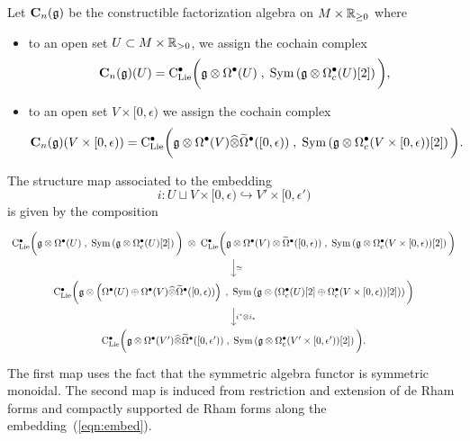 \documentclass[11pt]{amsart}
\numberwithin{equation}{section}
\def\brian{\textcolor{blue}{BW: }\textcolor{blue}}
\begin{document}
\begin{dfn}
\label{dfn:constructible1}
Let $\mathbf C_n(\mathfrak g)$ be the constructible factorization algebra on $M \times \mathbb R_{\geq 0}$ where
\begin{itemize}
\item to an open set $U \subset M \times \mathbb R_{> 0}$, we assign the cochain complex 
\[
\mathbf C_n (\mathfrak g) (U) = {\rm C}_{\rm Lie}^\bullet \bigg(\mathfrak g \otimes \Omega^\bullet (U) \; , \; {\rm Sym} \left(\mathfrak g \otimes \Omega^\bullet_c(U) [2] \right) \bigg), 
\]
\item to an open set $V \times [0,\epsilon)$ we assign the cochain complex 
\[
\mathbf C_n (\mathfrak g) (V \times [0,\epsilon)) = {\rm C}_{\rm Lie}^\bullet\bigg(\mathfrak g \otimes \Omega^\bullet(V) \widehat{\otimes} \widetilde{\Omega}^\bullet([0,\epsilon))  \; , \; {\rm Sym}\left(\mathfrak g \otimes \Omega^\bullet_c (V \times [0,\epsilon))[2] \right) \bigg).
\]
\end{itemize}
The structure map associated to the embedding 
\begin{equation}\label{eqn:embed}
i : U \sqcup V \times [0, \epsilon) \hookrightarrow V' \times [0,\epsilon')
\end{equation}
is given by the composition
\[
\begin{tikzcd}
\clies \bigg(\fg \otimes \Omega^\bu (U) \; , \; \Sym \left(\fg \otimes \Omega^\bu_c(U) [2] \right) \bigg) \; \otimes \;  \clies\bigg(\fg \otimes \Omega^\bu(V) \otimes \Tilde{\Omega}^\bu([0,\epsilon))  \; , \; \Sym\left(\fg \otimes \Omega^\bu_c (V \times [0,\epsilon))[2] \right) \bigg) \ar[d, "\simeq"] \\
\clies \bigg(\fg \otimes \left(\Omega^\bu (U) \oplus \Omega^\bu(V) \Hat{\otimes} \Tilde{\Omega}^\bu([0,\epsilon)) \right) \; , \; \Sym \left(\fg \otimes \left(\Omega^\bu_c(U) [2] \oplus \Omega^\bu_c(V \times [0,\epsilon)) [2]\right)\right) \bigg) \ar[d, "i^* \otimes i_*"] \\
\clies\bigg(\fg \otimes \Omega^\bu(V') \Hat{\otimes} \Tilde{\Omega}^\bu([0,\epsilon'))  \; , \; \Sym\left(\fg \otimes \Omega^\bu_c (V' \times [0,\epsilon'))[2] \right) \bigg).
\end{tikzcd}
\]
The first map uses the fact that the symmetric algebra functor is symmetric monoidal. 
The second map is induced from restriction and extension of de Rham forms and compactly supported de Rham forms along the embedding~(\ref{eqn:embed}). 
\end{dfn}
\end{document}
